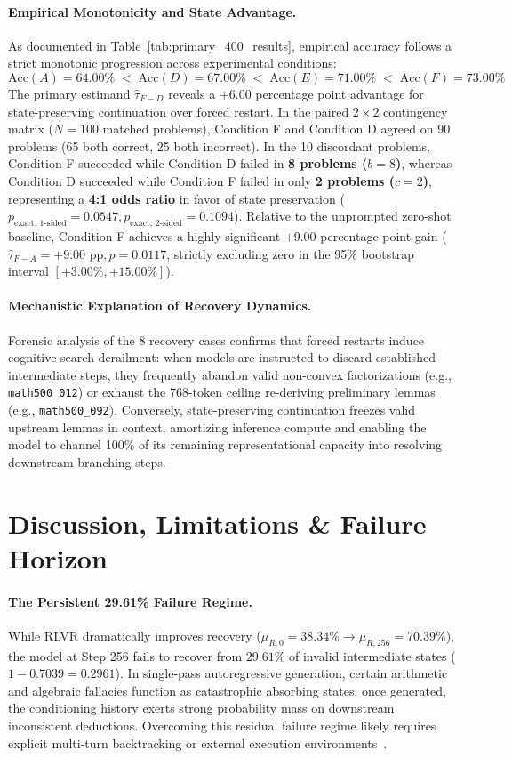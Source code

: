 \documentclass[11pt]{article}
\begin{document}
\paragraph{Empirical Monotonicity and State Advantage.}
As documented in Table~\ref{tab:primary_400_results}, empirical accuracy follows a strict monotonic progression across experimental conditions:
$$\text{Acc}(A) = 64.00\% \;<\; \text{Acc}(D) = 67.00\% \;<\; \text{Acc}(E) = 71.00\% \;<\; \text{Acc}(F) = 73.00\%$$
The primary estimand $\hat{\tau}_{F-D}$ reveals a $+6.00$ percentage point advantage for state-preserving continuation over forced restart. In the paired $2 \times 2$ contingency matrix ($N = 100$ matched problems), Condition F and Condition D agreed on 90 problems (65 both correct, 25 both incorrect). In the 10 discordant problems, Condition F succeeded while Condition D failed in \textbf{8 problems ($b = 8$)}, whereas Condition D succeeded while Condition F failed in only \textbf{2 problems ($c = 2$)}, representing a \textbf{4:1 odds ratio} in favor of state preservation ($p_{\text{exact, 1-sided}} = 0.0547, p_{\text{exact, 2-sided}} = 0.1094$). Relative to the unprompted zero-shot baseline, Condition F achieves a highly significant $+9.00$ percentage point gain ($\hat{\tau}_{F-A} = +9.00\text{ pp}, p = 0.0117$, strictly excluding zero in the 95\% bootstrap interval $[+3.00\%, +15.00\%]$).

\paragraph{Mechanistic Explanation of Recovery Dynamics.}
Forensic analysis of the 8 recovery cases confirms that forced restarts induce cognitive search derailment: when models are instructed to discard established intermediate steps, they frequently abandon valid non-convex factorizations (e.g., \texttt{math500\_012}) or exhaust the 768-token ceiling re-deriving preliminary lemmas (e.g., \texttt{math500\_092}). Conversely, state-preserving continuation freezes valid upstream lemmas in context, amortizing inference compute and enabling the model to channel 100\% of its remaining representational capacity into resolving downstream branching steps.

\section{Discussion, Limitations \& Failure Horizon}

\paragraph{The Persistent 29.61\% Failure Regime.}
While RLVR dramatically improves recovery ($\mu_{R,0}=38.34\% \to \mu_{R,256}=70.39\%$), the model at Step 256 fails to recover from $29.61\%$ of invalid intermediate states ($1 - 0.7039 = 0.2961$). In single-pass autoregressive generation, certain arithmetic and algebraic fallacies function as catastrophic absorbing states: once generated, the conditioning history exerts strong probability mass on downstream inconsistent deductions. Overcoming this residual failure regime likely requires explicit multi-turn backtracking or external execution environments~\cite{Kumar2024Training}.
\end{document}
